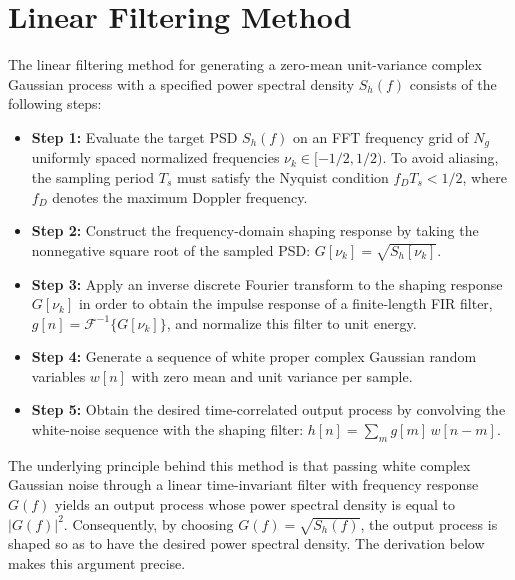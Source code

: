 \section{Linear Filtering Method}
\label{appendix:psd_method}

The linear filtering method for generating a zero-mean unit-variance complex Gaussian process with a specified power spectral density $S_h(f)$ consists of the following steps:
\begin{itemize}[label={}, leftmargin=0.5cm]

    \item \textbf{Step 1:}
    Evaluate the target \ac{PSD} $S_h(f)$ on an \acs{FFT} frequency grid of $N_g$ uniformly spaced normalized frequencies $\nu_k \in [-1/2, 1/2)$.
    To avoid aliasing, the sampling period $T_s$ must satisfy the Nyquist condition $f_D T_s < 1/2$, where $f_D$ denotes the maximum Doppler frequency.

    \item \textbf{Step 2:}
    Construct the frequency-domain shaping response by taking the nonnegative square root of the sampled \ac{PSD}: $G[\nu_k] = \sqrt{S_h[\nu_k]}$.

    \item \textbf{Step 3:}
    Apply an inverse discrete Fourier transform to the shaping response $G[\nu_k]$ in order to obtain the impulse response of a finite-length \acs{FIR} filter, $g[n] = \mathcal{F}^{-1}\{G[\nu_k]\}$, and normalize this filter to unit energy.

    \item \textbf{Step 4:}
    Generate a sequence of white proper complex Gaussian random variables $w[n]$ with zero mean and unit variance per sample.

    \item \textbf{Step 5:}
    Obtain the desired time-correlated output process by convolving the white-noise sequence with the shaping filter: $h[n] = \sum_m g[m]\, w[n-m]$.

\end{itemize}

The underlying principle behind this method is that passing white complex Gaussian noise through a linear time-invariant filter with frequency response $G(f)$ yields an output process whose power spectral density is equal to $|G(f)|^2$.
Consequently, by choosing $G(f) = \sqrt{S_h(f)}$, the output process is shaped so as to have the desired power spectral density.
The derivation below makes this argument precise.

